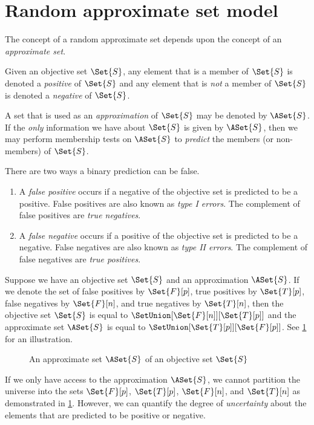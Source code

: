 \documentclass[ ../main.tex]{subfiles}
\begin{document}
\section{Random approximate set model}
\label{sec:asets}
The concept of a random approximate set depends upon the concept of an \emph{approximate set}.

Given an objective set $\Set{S}$, any element that is a member of $\Set{S}$ is denoted a \emph{positive} of $\Set{S}$ and any element that is \emph{not} a member of $\Set{S}$ is denoted a \emph{negative} of $\Set{S}$.

A set that is used as an \emph{approximation} of $\Set{S}$ may be denoted by $\ASet{S}$.
If the \emph{only} information we have about $\Set{S}$ is given by $\ASet{S}$, then we may perform membership tests on $\ASet{S}$ to \emph{predict} the members (or non-members) of $\Set{S}$.

There are two ways a binary prediction can be false.
\begin{enumerate}
    \item A \emph{false positive} occurs if a negative of the objective set is predicted to be a positive. False positives are also known as \emph{type I errors}.
    The complement of false positives are \emph{true negatives}.
    \item A \emph{false negative} occurs if a positive of the objective set is predicted to be a negative. False negatives are also known as \emph{type II errors}.
    The complement of false negatives are \emph{true positives}.
\end{enumerate} 

Suppose we have an objective set $\Set{S}$ and an approximation $\ASet{S}$.
If we denote the set of false positives by $\Set{F}[p]$, true positives by $\Set{T}[p]$, false negatives by $\Set{F}[n]$, and true negatives by $\Set{T}[n]$, then the objective set $\Set{S}$ is equal to $\SetUnion[\Set{F}[n]][\Set{T}[p]]$ and the approximate set $\ASet{S}$ is equal to $\SetUnion[\Set{T}[p]][\Set{F}[p]]$.
See \cref{fig:ex_approx_set} for an illustration.
\begin{figure}[ht]
\caption{An approximate set $\ASet{S}$ of an objective set $\Set{S}$}
\label{fig:ex_approx_set}
\centering
\def\svgwidth{\columnwidth/2}

\end{figure}

If we only have access to the approximation $\ASet{S}$, we cannot partition the universe into the sets $\Set{F}[p]$, $\Set{T}[p]$, $\Set{F}[n]$, and $\Set{T}[n]$ as demonstrated in \cref{fig:ex_approx_set}.
However, we can quantify the degree of \emph{uncertainty} about the elements that are predicted to be positive or negative.
\end{document}
